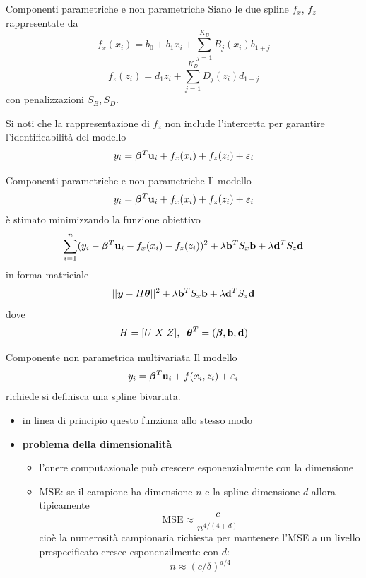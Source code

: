 \documentclass{beamer}\usepackage[]{graphicx}\usepackage[]{color}
\begin{document}
\begin{frame}{Componenti parametriche e non parametriche}
Siano le due spline $f_x$, $f_z$ rappresentate da
\[ f_x(x_i) = b_0 + b_1 x_i + \sum_{j=1}^{K_B} B_j(x_i)b_{1+j} \]
\[ f_z(z_i) = d_1 z_i + \sum_{j=1}^{K_D} D_j(z_i)d_{1+j} \]
con penalizzazioni $S_B, S_D$.

Si noti che la rappresentazione di $f_z$ non include l'intercetta per garantire l'identificabilit\`a del modello
\[ y_i = {\bm\beta}^T{\bf u}_i + f_x(x_i) + f_z(z_i) + \varepsilon_i \]
\end{frame}

\begin{frame}{Componenti parametriche e non parametriche}
Il modello
\[ y_i = {\bm\beta}^T{\bf u}_i + f_x(x_i) + f_z(z_i) + \varepsilon_i \]
\`e stimato minimizzando la funzione obiettivo
\[ \sum_{i=1}^n(y_i - {\bm\beta}^T{\bf u}_i - f_x(x_i)-f_z(z_i))^2 + \lambda{\bf b}^TS_x{\bf b}+ \lambda{\bf d}^TS_z{\bf d} \]
in forma matriciale
\[ ||{\bm y} - H{\bm\theta}||^2 + \lambda{\bf b}^TS_x{\bf b}+ \lambda{\bf d}^TS_z{\bf d} \]
dove
\[ H=[U\; X\; Z],\;\;{\bm\theta}^T=({\bm\beta},{\bf b},{\bf d})\]
\end{frame}

\begin{frame}{Componente non parametrica multivariata}
Il modello
\[ y_i = {\bm\beta}^T{\bf u}_i + f(x_i,z_i) + \varepsilon_i \]
richiede si definisca una spline bivariata.
\begin{itemize}
\item in linea di principio questo funziona allo stesso modo
\item {\bf problema della dimensionalit\`a}
\begin{itemize}
\item l'onere computazionale pu\`o crescere esponenzialmente con la dimensione
\item MSE: se il campione ha dimensione $n$ e la spline dimensione $d$ allora tipicamente
\[ \mbox{MSE} \approx \frac{c}{n^{4/(4+d)}} \]
cio\`e la numerosit\`a campionaria richiesta per mantenere l'MSE a un livello prespecificato cresce esponenzilmente con $d$:
\[ n \approx (c/\delta)^{d/4} \]
\end{itemize}
\end{itemize}
\end{frame}
\end{document}

